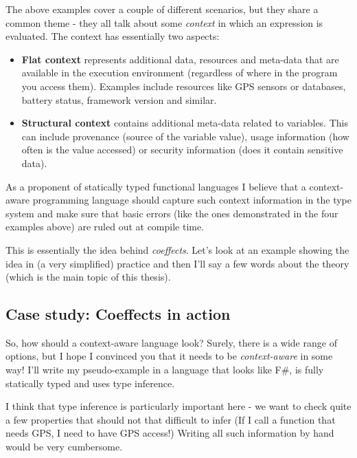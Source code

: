 The above examples cover a couple of different scenarios, but they share a common theme - 
they all talk about some \emph{context} in which an expression is evaluated. The context has 
essentially two aspects:

\begin{itemize}
\item \textbf{Flat context} represents additional data, resources and meta-data that are 
   available in the execution environment (regardless of where in the program you 
   access them). Examples include resources like GPS sensors or databases, battery status,
   framework version and similar. 

\item \textbf{Structural context} contains additional meta-data related to variables. This can include
   provenance (source of the variable value), usage information (how often is the value
   accessed) or security information (does it contain sensitive data). 
\end{itemize}

As a proponent of statically typed functional languages I believe that a context-aware 
programming language should capture such context information in the type system and make
sure that basic errors (like the ones demonstrated in the four examples above) are ruled
out at compile time.  

This is essentially the idea behind \emph{coeffects}. Let's look at an example showing the
idea in (a very simplified) practice and then I'll say a few words about the theory
(which is the main topic of this thesis).


\subsection{Case study: Coeffects in action}

So, how should a context-aware language look? Surely, there is a wide range of options, but I hope
I convinced you that it needs to be \emph{context-aware} in some way! I'll write my pseudo-example in a
language that looks like F\#, is fully statically typed and uses type inference.

I think that type inference is particularly important here - we want to check quite a few properties
that should not that difficult to infer (If I call a function that needs GPS, I need to have GPS access!)
Writing all such information by hand would be very cumbersome.

